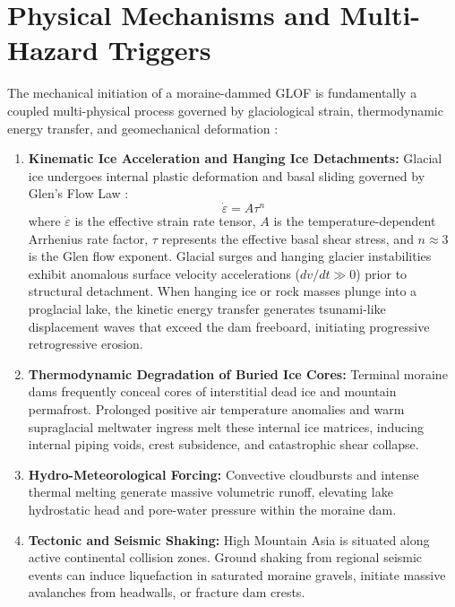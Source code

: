 \documentclass{mnnit}
\begin{document}
\section{Physical Mechanisms and Multi-Hazard Triggers}
The mechanical initiation of a moraine-dammed GLOF is fundamentally a coupled multi-physical process governed by glaciological strain, thermodynamic energy transfer, and geomechanical deformation \cite{cook2018glof, cui2014mechanism}:
\begin{enumerate}
    \item \textbf{Kinematic Ice Acceleration and Hanging Ice Detachments:} Glacial ice undergoes internal plastic deformation and basal sliding governed by Glen's Flow Law \cite{glen1955flow}:
    \begin{equation}
        \dot{\varepsilon} = A \tau^n
        \label{eq:glens_flow_law}
    \end{equation}
    where $\dot{\varepsilon}$ is the effective strain rate tensor, $A$ is the temperature-dependent Arrhenius rate factor, $\tau$ represents the effective basal shear stress, and $n \approx 3$ is the Glen flow exponent. Glacial surges and hanging glacier instabilities exhibit anomalous surface velocity accelerations ($dv/dt \gg 0$) prior to structural detachment. When hanging ice or rock masses plunge into a proglacial lake, the kinetic energy transfer generates tsunami-like displacement waves that exceed the dam freeboard, initiating progressive retrogressive erosion.
    \item \textbf{Thermodynamic Degradation of Buried Ice Cores:} Terminal moraine dams frequently conceal cores of interstitial dead ice and mountain permafrost. Prolonged positive air temperature anomalies and warm supraglacial meltwater ingress melt these internal ice matrices, inducing internal piping voids, crest subsidence, and catastrophic shear collapse.
    \item \textbf{Hydro-Meteorological Forcing:} Convective cloudbursts and intense thermal melting generate massive volumetric runoff, elevating lake hydrostatic head and pore-water pressure within the moraine dam.
    \item \textbf{Tectonic and Seismic Shaking:} High Mountain Asia is situated along active continental collision zones. Ground shaking from regional seismic events can induce liquefaction in saturated moraine gravels, initiate massive avalanches from headwalls, or fracture dam crests.
\end{enumerate}
\end{document}
